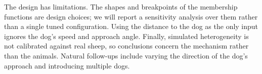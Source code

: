 \documentclass[9pt,twoside]{pnas-new}
\begin{document}
The design has limitations. The shapes and breakpoints of the membership functions are design choices; we will report a sensitivity analysis over them rather than a single tuned configuration. Using the distance to the dog as the only input ignores the dog's speed and approach angle. Finally, simulated heterogeneity is not calibrated against real sheep, so conclusions concern the mechanism rather than the animals. Natural follow-ups include varying the direction of the dog's approach and introducing multiple dogs.




\end{document}
